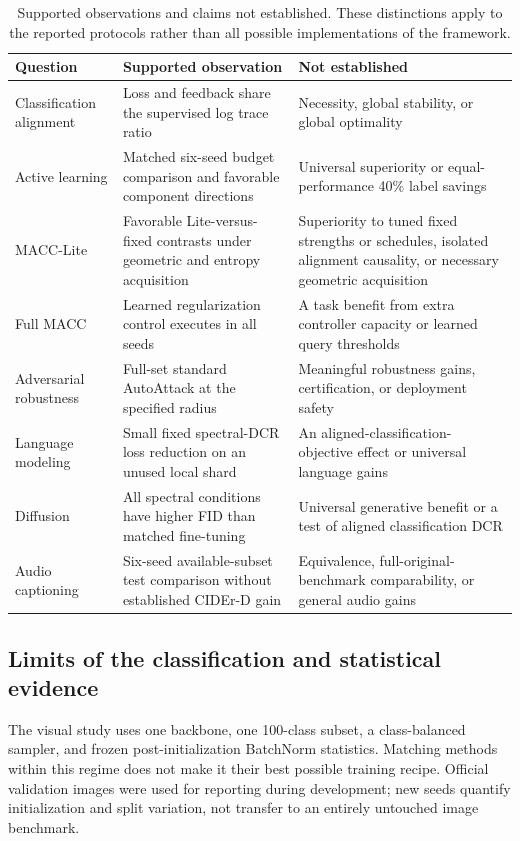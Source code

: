 \documentclass[a4paper,fleqn]{cas-dc}
\let\CAENLcaption\caption
\let\caption\CAENLcaption
\begin{document}
\begin{table}[pos=tbp]
\caption{Supported observations and claims not established.
These distinctions apply to the reported protocols rather
than all possible implementations of the framework.}
\label{tab:claim_boundaries}
\centering\small
\begin{tabularx}{\textwidth}{@{}p{}YY@{}}
\toprule
Question & Supported observation & Not established \\
\midrule
Classification alignment &
Loss and feedback share the supervised log trace ratio &
Necessity, global stability, or global optimality \\
Active learning &
Matched six-seed budget comparison and favorable component directions &
Universal superiority or equal-performance 40\% label savings \\
MACC-Lite &
Favorable Lite-versus-fixed contrasts under geometric and entropy acquisition &
Superiority to tuned fixed strengths or schedules, isolated alignment
causality, or necessary geometric acquisition \\
Full MACC &
Learned regularization control executes in all seeds &
A task benefit from extra controller capacity or learned query thresholds \\
Adversarial robustness &
Full-set standard AutoAttack at the specified radius &
Meaningful robustness gains, certification, or deployment safety \\
Language modeling &
Small fixed spectral-DCR loss reduction on an unused local shard &
An aligned-classification-objective effect or universal language gains \\
Diffusion &
All spectral conditions have higher FID than matched fine-tuning &
Universal generative benefit or a test of aligned classification DCR \\
Audio captioning &
Six-seed available-subset test comparison without established CIDEr-D gain &
Equivalence, full-original-benchmark comparability, or general audio gains \\
\bottomrule
\end{tabularx}
\end{table}


\subsection{Limits of the classification and statistical evidence}

The visual study uses one backbone, one 100-class subset,
a class-balanced sampler, and frozen post-initialization
BatchNorm statistics.
Matching methods within this regime does not make it their
best possible training recipe.
Official validation images were used for reporting during
development; new seeds quantify initialization and split
variation, not transfer to an entirely untouched image benchmark.
\end{document}
